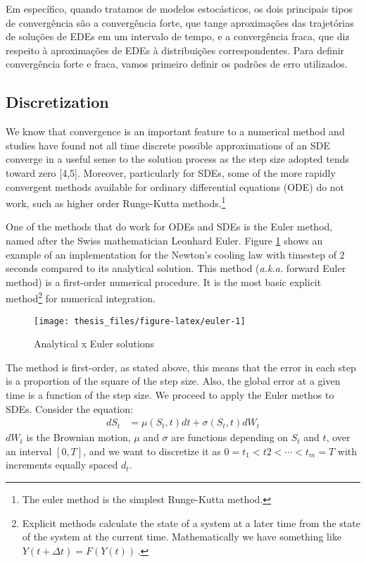 \documentclass[12pt,twoside]{reedthesis}
\theoremstyle{definition}
\theoremstyle{definition}
\theoremstyle{remark}
\begin{document}
  Em específico, quando tratamos de modelos estocásticos, os dois
  principais tipos de convergência são a convergência forte, que tange
  aproximações das trajetórias de soluções de EDEs em um intervalo de
  tempo, e a convergência fraca, que diz respeito à aproximações de EDEs à
  distribuições correspondentes. Para definir convergência forte e fraca,
  vamos primeiro definir os padrões de erro utilizados.
  
  \subsection{Discretization}\label{discretization}
  
  We know that convergence is an important feature to a numerical method
  and studies have found not all time discrete possible approximations of
  an SDE converge in a useful sense to the solution process as the step
  size adopted tends toward zero {[}4,5{]}. Moreover, particularly for
  SDEs, some of the more rapidly convergent methods available for ordinary
  differential equations (ODE) do not work, such as higher order
  Runge-Kutta methods.\footnote{The euler method is the simplest
    Runge-Kutta method.}
  
  One of the methods that do work for ODEs and SDEs is the Euler method,
  named after the Swiss mathematician Leonhard Euler. Figure
  \ref{fig:euler} shows an example of an implementation for the Newton's
  cooling law with timestep of 2 seconds compared to its analytical
  solution. This method (\emph{a.k.a.} forward Euler method) is a
  first-order numerical procedure. It is the most basic explicit
  method\footnote{Explicit methods calculate the state of a system at a
    later time from the state of the system at the current time.
    Mathematically we have something like \(Y(t+\Delta t)=F(Y(t))\,\).}
  for numerical integration.
  \begin{figure}
  
  {\centering \texttt{[image: thesis\_files/figure-latex/euler-1]} 
  
  }
  
  \caption{Analytical x Euler solutions \label{euler}}\label{fig:euler}
  \end{figure}
  The method is first-order, as stated above, this means that the error in
  each step is a proportion of the square of the step size. Also, the
  global error at a given time is a function of the step size. We proceed
  to apply the Euler methos to SDEs. Consider the equation:
  \begin{align}
  dS_t &= \mu(S_t,t) dt + \sigma(S_t,t) dW_t
  \end{align}
  \(dW_t\) is the Brownian motion, \(\mu\) and \(\sigma\) are functions
  depending on \(S_t\) and \(t\), over an interval \([0,T]\), and we want
  to discretize it as \(0 = t_1 < t2 < \cdots < t_m = T\) with increments
  equally spaced \(d_t\).
  
\end{document}
